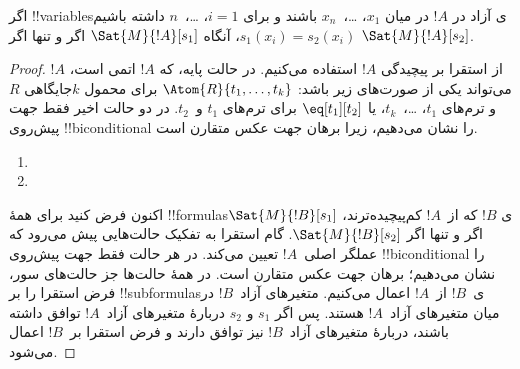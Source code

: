 \documentclass[../../../include/open-logic-section]{subfiles}
\begin{document}
\begin{prop}
اگر !!{variable}sی آزاد در $!A$ در میان $x_1$، \dots،~$x_n$ باشند و
برای $i = 1$، \dots،~$n$ داشته باشیم $s_1(x_i) = s_2(x_i)$، آنگاه
$\Sat{M}{!A}[s_1]$ اگر و تنها اگر $\Sat{M}{!A}[s_2]$.
\end{prop}

\begin{proof}
از استقرا بر پیچیدگی $!A$ استفاده می‌کنیم. در حالت پایه، که $!A$ اتمی
است، $!A$ می‌تواند یکی از صورت‌های زیر باشد:
$\Atom{R}{t_1, \dots, t_k}$ برای محمول $k$جایگاهی $R$ و
ترم‌های $t_1$، \dots،~$t_k$، یا $\eq[t_1][t_2]$ برای ترم‌های $t_1$
و~$t_2$. در دو حالت اخیر فقط جهت پیش‌روی !!{biconditional} را نشان
می‌دهیم، زیرا برهان جهت عکس متقارن است.

\begin{enumerate}


\item
\item
\end{enumerate}

اکنون فرض کنید برای همهٔ !!{formula}sی $!B$ که از~$!A$ کم‌پیچیده‌ترند،
$\Sat{M}{!B}[s_1]$ اگر و تنها اگر $\Sat{M}{!B}[s_2]$. گام استقرا به
تفکیک حالت‌هایی پیش می‌رود که عملگر اصلی~$!A$ تعیین می‌کند. در هر حالت
فقط جهت پیش‌روی !!{biconditional} را نشان می‌دهیم؛ برهان جهت عکس متقارن
است. در همهٔ حالت‌ها جز حالت‌های سور، فرض استقرا را بر
!!{subformula}sی~$!B$ از~$!A$ اعمال می‌کنیم. متغیرهای آزاد~$!B$ در میان
متغیرهای آزاد~$!A$ هستند. پس اگر $s_1$ و $s_2$ دربارهٔ متغیرهای آزاد~$!A$
توافق داشته باشند، دربارهٔ متغیرهای آزاد~$!B$ نیز توافق دارند و فرض استقرا
بر~$!B$ اعمال می‌شود.


\end{proof}
\end{document}
